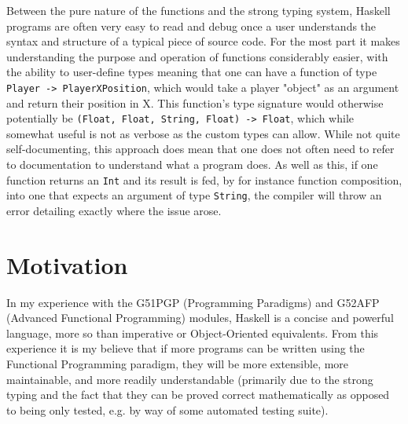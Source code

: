 \documentclass[12pt, a4paper]{report}
\begin{document}
\par

Between the pure nature of the functions and the strong typing system, Haskell programs are often very easy to read and debug once a user understands the syntax and structure of a typical piece of source code.
For the most part it makes understanding the purpose and operation of functions considerably easier, with the ability to user-define types meaning that one can have a function of type \verb|Player -> PlayerXPosition|, which would take a player "object" as an argument and return their position in X.
This function's type signature would otherwise potentially be \verb|(Float, Float, String, Float) -> Float|, which while somewhat useful is not as verbose as the custom types can allow.
While not quite self-documenting, this approach does mean that one does not often need to refer to documentation to understand what a program does.
As well as this, if one function returns an \verb|Int| and its result is fed, by for instance function composition, into one that expects an argument of type \verb|String|, the compiler will throw an error detailing exactly where the issue arose.

\section{Motivation}
In my experience with the G51PGP (Programming Paradigms) and G52AFP (Advanced Functional Programming) modules, Haskell is a concise and powerful language, more so than imperative or Object-Oriented equivalents.
From this experience it is my believe that if more programs can be written using the Functional Programming paradigm, they will be more extensible, more maintainable, and more readily understandable (primarily due to the strong typing and the fact that they can be proved correct mathematically as opposed to being only tested, e.g. by way of some automated testing suite).

\par
\end{document}
